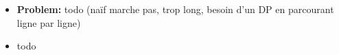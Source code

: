 \begin{frame}
    \frametitle{\problemtitle}
    \begin{itemize}
        \item<+-> \textbf{Problem:} todo (naïf marche pas, trop long, besoin d'un DP en parcourant ligne par ligne)
        \item<+-> todo
    \end{itemize}
\end{frame}
